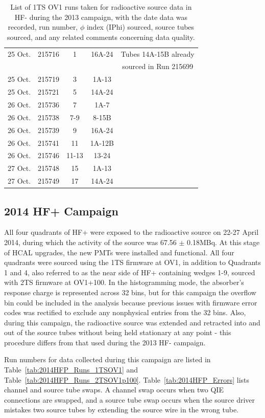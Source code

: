 \begin{table}[htb]
{\begin{tabular}{|c|c|c|c|c|}
  \hline
  25 Oct. & 215716 & 1 & 16A-24 & Tubes 14A-15B already \\
  &&&& sourced in Run 215699 \\
  \hline
  25 Oct. & 215719 & 3 & 1A-13 & \\
  \hline
  25 Oct. & 215721 & 5 & 14A-24 & \\
  \hline
  26 Oct. & 215736 & 7 & 1A-7 & \\
  \hline
  26 Oct. & 215738 & 7-9 & 8-15B & \\
  \hline
  26 Oct. & 215739 & 9 & 16A-24 & \\
  \hline
  26 Oct. & 215741 & 11 & 1A-12B & \\
  \hline
  26 Oct. & 215746 & 11-13 & 13-24 & \\
  \hline
  27 Oct. & 215748 & 15 & 1A-13 & \\
  \hline
  27 Oct. & 215749 & 17 & 14A-24 & \\
  \hline
  \end{tabular}}
  \caption{List of 1TS OV1 runs taken for radioactive source data in HF- during the 2013
  campaign, with the date data was recorded, run number, $\phi$ index (IPhi) sourced, source
  tubes sourced, and any related comments concerning data quality.}
  \label{tab:2013HFM_Runs}
\end{table}

\subsection{2014 HF+ Campaign}
All four quadrants of HF+ were exposed to the radioactive source on 22-27 April
2014, during which the activity of the source was 67.56 $\pm$ 0.18\unit{MBq}.
At this stage of HCAL upgrades, the new PMTs were installed and functional.
All four quadrants were sourced using the 1TS firmware at OV1, in addition to
Quadrants 1 and 4, also referred to as the near side of HF+ containing wedges
1-9, sourced with 2TS firmware at OV1+100. In the histogramming mode, the
absorber's response charge is represented across 32 bins, but for this campaign
the overflow bin could be included in the analysis because previous issues with
firmware error codes was rectified to exclude any nonphysical entries from the
32 bins. Also, during this campaign, the radioactive source was extended and
retracted into and out of the source tubes without being held stationary at any
point - this procedure differs from that used during the 2013 HF- campaign.

Run numbers for data collected during this campaign are listed in
Table~\ref{tab:2014HFP_Runs_1TSOV1} and Table~\ref{tab:2014HFP_Runs_2TSOV1p100}.
Table~\ref{tab:2014HFP_Errors} lists channel and source tube swaps. A channel swap occurs when two
QIE connections are swapped, and a source tube swap occurs when the source driver
mistakes two source tubes by extending the source wire in the wrong tube.

